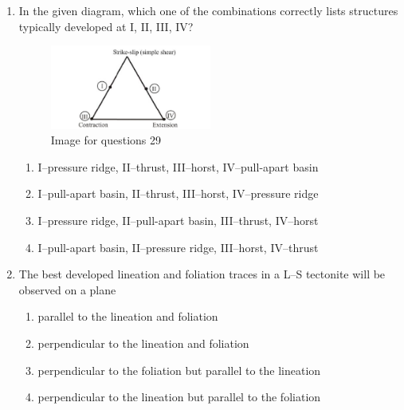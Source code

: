 \documentclass[journal,12pt,onecolumn]{IEEEtran}
\theoremstyle{remark}
\begin{document}
\begin{enumerate}
\begin{multicols}{2}
\begin{enumerate}
\item P
\item Q
\item R
\item S
\end{enumerate}
\end{multicols}


\item In the given diagram, which one of the combinations correctly lists structures typically developed at I, II, III, IV?  

\begin{figure}[H]
    \centering
    \includegraphics[width=0.5\textwidth]{figs/fig1.png}
    \caption{Image for questions 29}
    \label{fig:question29}
\end{figure}







\begin{enumerate}
\item I--pressure ridge, II--thrust, III--horst, IV--pull-apart basin
\item I--pull-apart basin, II--thrust, III--horst, IV--pressure ridge
\item I--pressure ridge, II--pull-apart basin, III--thrust, IV--horst
\item I--pull-apart basin, II--pressure ridge, III--horst, IV--thrust
\end{enumerate}


\item The best developed lineation and foliation traces in a L--S tectonite will be observed on a plane  
\begin{enumerate}
\item parallel to the lineation and foliation
\item perpendicular to the lineation and foliation
\item perpendicular to the foliation but parallel to the lineation
\item perpendicular to the lineation but parallel to the foliation
\end{enumerate}




\end{enumerate}
\end{document}
